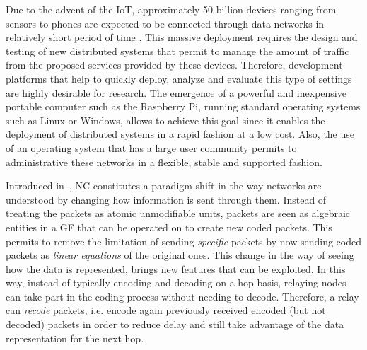 %

Due to the advent of the \ac{IoT}, approximately 50 billion devices
ranging from sensors to phones are expected to be connected through
data networks in relatively short period of time \cite{cisco2011forecast}.
This massive deployment requires the design and testing of new
distributed systems that permit to manage the amount of traffic
from the proposed services provided by these devices. Therefore,
development platforms that help to quickly deploy, analyze and
evaluate this type of settings are highly desirable for research.
The emergence of a powerful and inexpensive portable computer such
as the Raspberry Pi, running standard operating systems such as
Linux or Windows, allows to achieve this goal since it enables the
deployment of distributed systems in a rapid fashion at a low cost.
Also, the use of an operating system that has a large user community
permits to administrative these networks in a flexible, stable and
supported fashion.

Introduced in~\cite{ahlswede2000network}, \ac{NC}
constitutes a paradigm shift in the way networks are understood
by changing how information is sent through them.
Instead of treating the packets as atomic
unmodifiable units, packets are seen as algebraic entities in a \ac{GF}
that can be operated on to create new coded packets. This permits to
remove the limitation of sending \textit{specific} packets by now sending
coded packets as \textit{linear equations} of the original ones. This
change in the way of seeing how the data is represented, brings new
features that can be exploited. In this way, instead of typically encoding
and decoding on a hop basis, relaying nodes can take part in the
coding process without needing to decode. Therefore, a relay can
\textit{recode} packets, i.e. encode again previously received encoded
(but not decoded) packets in order to reduce delay and still
take advantage of the data representation for the next hop.

